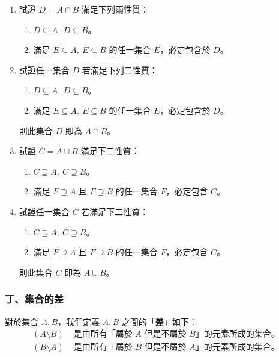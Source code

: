 \begin{enumerate}[1., leftmargin=2em]
\begin{enumerate}[(i)]
    \item 設 $A \subseteq B$，而 $H$ 為任意集合，則 $A \cup H \subseteq B \cup H$。
    \item 設 $A \subseteq B$，而 $H$ 為任意集合，則 $A \cap H \subseteq B \cap H$。
    \item $A \cup (A \cap B) = A$。
    \item $B \cap (A \cup B) = B$。
  \end{enumerate}
  \item[*] 試證 $D = A \cap B$ 滿足下列兩性質：
  \begin{enumerate}[(1)]
    \item $D \subseteq A, \ D \subseteq B$。
    \item 滿足 $E \subseteq A, \ E \subseteq B$ 的任一集合 $E$，必定包含於 $D$。
  \end{enumerate}
  \item[*] 試證任一集合 $D$ 若滿足下列二性質：
  \begin{enumerate}[(1)]
    \item $D \subseteq A, \ D \subseteq B$。
    \item 滿足 $E \subseteq A, \ E \subseteq B$ 的任一集合 $E$，必定包含於 $D$。
  \end{enumerate}
  則此集合 $D$ 即為 $A \cap B$。
  \item[*] 試證 $C = A \cup B$ 滿足下二性質：
  \begin{enumerate}[(1)]
    \item $C \supseteq A, \ C \supseteq B$。
    \item 滿足 $F \supseteq A$ 且 $F \supseteq B$ 的任一集合 $F$，必定包含 $C$。
  \end{enumerate}
  \item[*] 試證任一集合 $C$ 若滿足下二性質：
  \begin{enumerate}[(1)]
    \item $C \supseteq A, \ C \supseteq B$。
    \item 滿足 $F \supseteq A$ 且 $F \supseteq B$ 的任一集合 $F$，必定包含 $C$。
  \end{enumerate}
  則此集合 $C$ 即為 $A \cup B$。
\end{enumerate}

\subsubsection*{丁、集合的差}\label{subsec:2-3-d}

對於集合 $A, B$，我們定義 $A, B$ 之間的「\textbf{差}」如下：
\begin{align*}
  (A \setminus B) &\text{ 是由所有「屬於 $A$ 但是不屬於 $B$」的元素所成的集合。} \\
  (B \setminus A) &\text{ 是由所有「屬於 $B$ 但是不屬於 $A$」的元素所成的集合。}
\end{align*}


